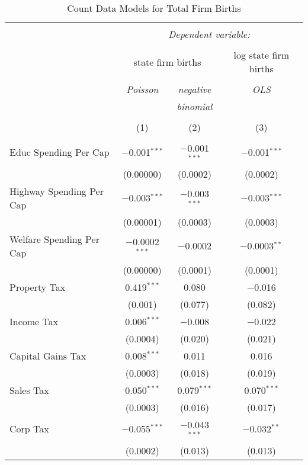 
\begin{table}[!htbp] \centering 
  \caption{Count Data Models for Total Firm Births} 
  \label{} 
\begin{tabular}{@{\extracolsep{5pt}}lccc} 
\\[-1.8ex]\hline 
\hline \\[-1.8ex] 
 & \multicolumn{3}{c}{\textit{Dependent variable:}} \\ 
\cline{2-4} 
\\[-1.8ex] & \multicolumn{2}{c}{state firm births} & log state firm births \\ 
\\[-1.8ex] & \textit{Poisson} & \textit{negative} & \textit{OLS} \\ 
 & \textit{} & \textit{binomial} & \textit{} \\ 
\\[-1.8ex] & (1) & (2) & (3)\\ 
\hline \\[-1.8ex] 
 Educ Spending Per Cap & $-$0.001$^{***}$ & $-$0.001$^{***}$ & $-$0.001$^{***}$ \\ 
  & (0.00000) & (0.0002) & (0.0002) \\ 
  Highway Spending Per Cap  & $-$0.003$^{***}$ & $-$0.003$^{***}$ & $-$0.003$^{***}$ \\ 
  & (0.00001) & (0.0003) & (0.0003) \\ 
  Welfare Spending Per Cap  & $-$0.0002$^{***}$ & $-$0.0002 & $-$0.0003$^{**}$ \\ 
  & (0.00000) & (0.0001) & (0.0001) \\ 
  Property Tax & 0.419$^{***}$ & 0.080 & $-$0.016 \\ 
  & (0.001) & (0.077) & (0.082) \\ 
  Income Tax & 0.006$^{***}$ & $-$0.008 & $-$0.022 \\ 
  & (0.0004) & (0.020) & (0.021) \\ 
  Capital Gains Tax & 0.008$^{***}$ & 0.011 & 0.016 \\ 
  & (0.0003) & (0.018) & (0.019) \\ 
  Sales Tax & 0.050$^{***}$ & 0.079$^{***}$ & 0.070$^{***}$ \\ 
  & (0.0003) & (0.016) & (0.017) \\ 
  Corp Tax & $-$0.055$^{***}$ & $-$0.043$^{***}$ & $-$0.032$^{**}$ \\ 
  & (0.0002) & (0.013) & (0.013) \\ 

\end{tabular}
\end{table}
